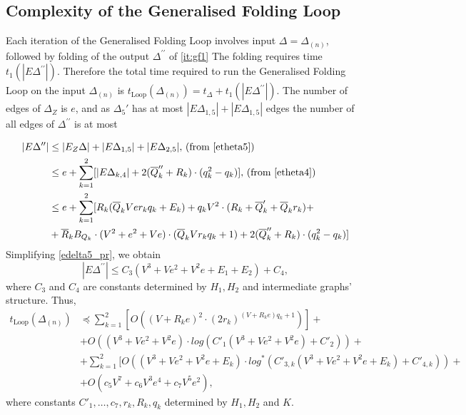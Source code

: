 \documentclass[a4paper,12pt]{article}
\newcommand{\D}{\Delta }
\numberwithin{equation}{section}
\numberwithin{figure}{section}
\newcommand{\Loop}{\operatorname{Loop}}
\begin{document}
\subsection{Complexity of the Generalised Folding Loop}\label{sub:loop}
Each iteration of the Generalised Folding Loop involves input $\D=\D_{(n)}$, followed by
folding of the output $\D^{\prime\prime}$ of \ref{it:gf1}
The folding requires time $t_1(|E\D^{\prime\prime}|)$. Therefore the
total time required to run the Generalised Folding Loop on the input $\D_{(n)}$ is
 $t_{\Loop}(\D_{(n)})= t_{\D}+t_1(|E\D^{\prime\prime}|)$.
 The number of edges of $\D_Z$ is $e$,
and as $\D_5'$ has at most  $|E\D_{1,5}|+|E\D_{1,5}|$ edges the number of all edges of $\D^{\prime\prime}$ is at most

\begin{equation}\label{edelta5_pr}
\begin{split}
|E\D^{\prime\prime}|&\le |E_Z\D| +|E\D_{1,5}|+|E\D_{2,5}|, \, (\textrm{from \eqref{etheta5}})\\
&\le e + \sum_{k=1}^2[|E\D_{k,4}|+ 2(\overline{Q}''_k+
R_k)\cdot(q_k^2-q_k)], \, (\textrm{from \eqref{etheta4}})\\
&\le e + \sum_{k=1}^2[R_k(\overline{Q}_k V e r_k q_k + E_k) + q_k V^2\cdot (R_k + \overline{Q}'_k + \overline{Q}_k r_k) +\\
&+ \overline{R}_k B_{Q_k} \cdot(V^2+ e^2 + Ve)\cdot(\overline{Q}_k
V r_k q_k +1) + 2(\overline{Q}''_k+
R_k)\cdot(q_k^2-q_k)]
\end{split}
\end{equation}
Simplifying \eqref{edelta5_pr}, we obtain
\begin{equation}\label{edelta5_rough}
|E\D^{\prime\prime}|\le C_3(V^3+V e^2 +V^2 e+E_1+E_2)+C_4,
\end{equation}
where $C_3$ and $C_4$ are constants determined by $H_1, H_2$ and intermediate graphs' structure.
Thus,
\begin{equation}\label{tloop}
\begin{split}
t_{\Loop}(\D_{(n)}) &\preceq \sum_{k=1}^2[ O((V +R_k e)^2\cdot (2r_k)^{(V + R_k e) q_k +1})]+ \\
&+O((V^3 + V e^2 + V^2 e)\cdot log (C'_1(V^3 + V e^2 + V^2 e)+C'_2))+ \\
&+  \sum_{k=1}^2[ O( (V^3 + V e^2 + V^2 e +E_k)\cdot log^{\ast} (C'_{3,k}(V^3 + V e^2 + V^2 e+E_k)+C'_{4,k}))+\\ 
&+O(c_5 V^7 + c_6 V^3 e^4 + c_7 V^5 e^2),
%
\end{split} 
\end{equation}
where constants $C'_1, \ldots, c_7, r_k, R_k, q_k$ determined by $H_1, H_2$ and $K$.
\end{document}
